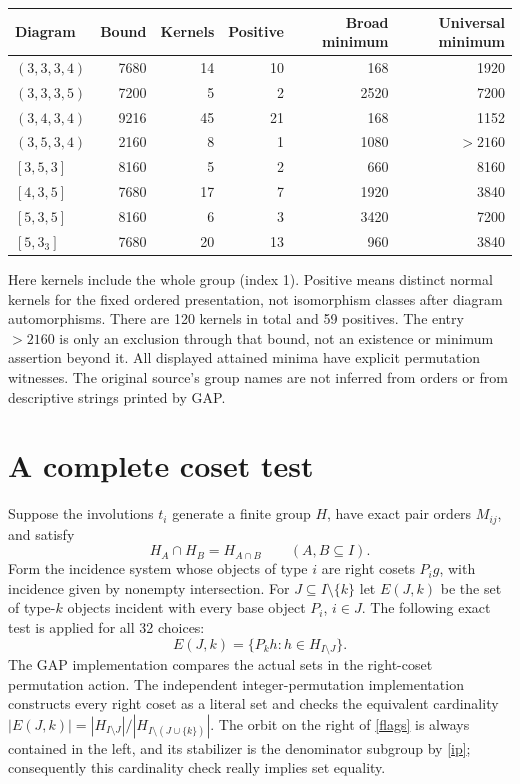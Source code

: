 \documentclass[11pt]{article}
\begin{document}
\begin{center}\small
\begin{tabular}{lrrrrr}\toprule
Diagram & Bound & Kernels & Positive & Broad minimum & Universal minimum\\\midrule
$(3,3,3,4)$&7680&14&10&168&1920\\
$(3,3,3,5)$&7200&5&2&2520&7200\\
$(3,4,3,4)$&9216&45&21&168&1152\\
$(3,5,3,4)$&2160&8&1&1080&$>2160$\\
$[3,5,3]$&8160&5&2&660&8160\\
$[4,3,5]$&7680&17&7&1920&3840\\
$[5,3,5]$&8160&6&3&3420&7200\\
$[5,3_3]$&7680&20&13&960&3840\\\bottomrule
\end{tabular}
\end{center}
Here kernels include the whole group (index 1). Positive means distinct
normal kernels for the fixed ordered presentation, not isomorphism classes
after diagram automorphisms. There are 120 kernels in total and 59 positives.
The entry $>2160$ is only an exclusion through that bound, not an existence
or minimum assertion beyond it. All displayed attained minima have explicit
permutation witnesses. The original source's group names are not inferred
from orders or from descriptive strings printed by GAP.

\section{A complete coset test}
Suppose the involutions $t_i$ generate a finite group $H$, have exact pair
orders $M_{ij}$, and satisfy
\begin{equation}\label{ip}
 H_A\cap H_B=H_{A\cap B}\qquad(A,B\subseteq I).
\end{equation}
Form the incidence system whose objects of type $i$ are right cosets
$P_i g$, with incidence given by nonempty intersection. For
$J\subseteq I\setminus\{k\}$ let $E(J,k)$ be the set of type-$k$ objects
incident with every base object $P_i$, $i\in J$. The following exact test
is applied for all 32 choices:
\begin{equation}\label{flags}
 E(J,k)=\{P_k h:h\in H_{I\setminus J}\}.
\end{equation}
The GAP implementation compares the actual sets in the right-coset
permutation action. The independent integer-permutation implementation
constructs every right coset as a literal set and checks the equivalent
cardinality
$|E(J,k)|=|H_{I\setminus J}|/|H_{I\setminus(J\cup\{k\})}|$.
The orbit on the right of \eqref{flags} is always contained in the left,
and its stabilizer is the denominator subgroup by \eqref{ip}; consequently
this cardinality check really implies set equality.
\end{document}
